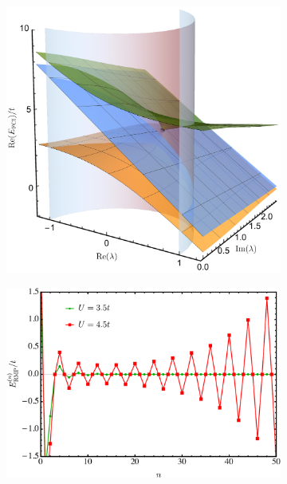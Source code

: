 \documentclass[aps,prb,reprint,noshowkeys,superscriptaddress]{revtex4-1}
\begin{document}
\begin{figure}
	\begin{subfigure}{0.32\textwidth}
	\includegraphics[height=0.75\textwidth]{fig2a}	
    \end{subfigure}
    \begin{subfigure}{0.32\textwidth}
	\includegraphics[height=0.75\textwidth]{fig2b}
		\subcaption{\label{subfig:RMP_cvg}}
    \end{subfigure}
    \begin{subfigure}{0.32\textwidth}

\end{subfigure}
\end{figure}
\end{document}
